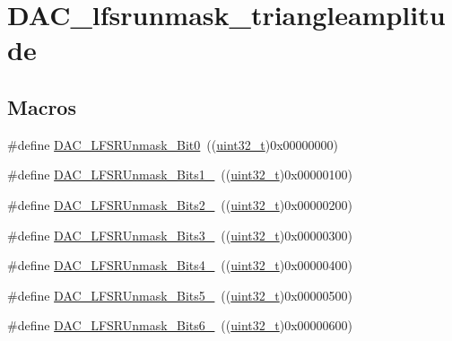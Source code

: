 \hypertarget{group___d_a_c__lfsrunmask__triangleamplitude}{}\section{D\+A\+C\+\_\+lfsrunmask\+\_\+triangleamplitude}
\label{group___d_a_c__lfsrunmask__triangleamplitude}
\subsection*{Macros}
\begin{DoxyCompactItemize}
\item 
\#define \hyperlink{group___d_a_c__lfsrunmask__triangleamplitude_ga60794fd5092a332cfa82e1cee13945fc}{D\+A\+C\+\_\+\+L\+F\+S\+R\+Unmask\+\_\+\+Bit0}~((\hyperlink{_p_e___types_8h_a33594304e786b158f3fb30289278f5af}{uint32\+\_\+t})0x00000000)
\item 
\#define \hyperlink{group___d_a_c__lfsrunmask__triangleamplitude_ga09f47cfa563252a1add4662284350c07}{D\+A\+C\+\_\+\+L\+F\+S\+R\+Unmask\+\_\+\+Bits1\+\_}~((\hyperlink{_p_e___types_8h_a33594304e786b158f3fb30289278f5af}{uint32\+\_\+t})0x00000100)
\item 
\#define \hyperlink{group___d_a_c__lfsrunmask__triangleamplitude_ga60b800857b7e33d9c0be2846fc56849f}{D\+A\+C\+\_\+\+L\+F\+S\+R\+Unmask\+\_\+\+Bits2\+\_}~((\hyperlink{_p_e___types_8h_a33594304e786b158f3fb30289278f5af}{uint32\+\_\+t})0x00000200)
\item 
\#define \hyperlink{group___d_a_c__lfsrunmask__triangleamplitude_gafe219362b3a48d8678a65ef38cb45532}{D\+A\+C\+\_\+\+L\+F\+S\+R\+Unmask\+\_\+\+Bits3\+\_}~((\hyperlink{_p_e___types_8h_a33594304e786b158f3fb30289278f5af}{uint32\+\_\+t})0x00000300)
\item 
\#define \hyperlink{group___d_a_c__lfsrunmask__triangleamplitude_ga2543d802e19d592a26c8231be663cdac}{D\+A\+C\+\_\+\+L\+F\+S\+R\+Unmask\+\_\+\+Bits4\+\_}~((\hyperlink{_p_e___types_8h_a33594304e786b158f3fb30289278f5af}{uint32\+\_\+t})0x00000400)
\item 
\#define \hyperlink{group___d_a_c__lfsrunmask__triangleamplitude_ga71a01660d410823bfe76a603080dc125}{D\+A\+C\+\_\+\+L\+F\+S\+R\+Unmask\+\_\+\+Bits5\+\_}~((\hyperlink{_p_e___types_8h_a33594304e786b158f3fb30289278f5af}{uint32\+\_\+t})0x00000500)
\item 
\#define \hyperlink{group___d_a_c__lfsrunmask__triangleamplitude_ga48fe2d3f4274d6bf28e446ca0001ed5d}{D\+A\+C\+\_\+\+L\+F\+S\+R\+Unmask\+\_\+\+Bits6\+\_}~((\hyperlink{_p_e___types_8h_a33594304e786b158f3fb30289278f5af}{uint32\+\_\+t})0x00000600)

\end{DoxyCompactItemize}
